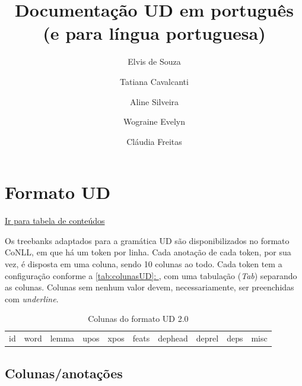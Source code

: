 \documentclass[output=paper,colorlinks,citecolor=brown]{langscibook}
\author{Elvis de Souza\affiliation{PUC-Rio, Brasil}\and Tatiana Cavalcanti\and Aline Silveira\and Wograine Evelyn\and Cláudia Freitas}
\title{Documentação UD em português\\
(e para língua portuguesa)}
\newcommand*{\fullref}[1]{\hyperref[{#1}]{\autoref*{#1}: \nameref*{#1}}} %
\begin{document}
\maketitle


\tableofcontents

\chapter{Formato UD}\label{sec:formatoud}

\hyperlink{toc}{Ir para tabela de conteúdos\\}

Os treebanks adaptados para a gramática UD são disponibilizados no formato CoNLL, em que há um token por linha. Cada anotação de cada token, por sua vez, é disposta em uma coluna, sendo 10 colunas ao todo. Cada token tem a configuração conforme a \fullref{tab:colunasUD}, com uma tabulação (\textit{Tab}) separando as colunas. Colunas sem nenhum valor devem, necessariamente, ser preenchidas com \textit{underline}.

\begin{table}
    \centering
    \begin{tabular}{c c c c c c c c c c}
        id & word & lemma & upos & xpos & feats & dephead & deprel & deps & misc\\
    \end{tabular}
    \caption{Colunas do formato UD 2.0}
    \label{tab:colunasUD}
\end{table}

\section{Colunas/anotações}\label{sec:colunas}
\end{document}
